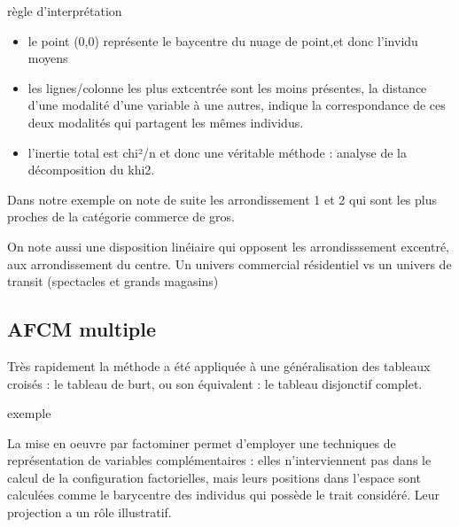 \documentclass[
]{book}
\newenvironment{Shaded}{\begin{snugshade}}{\end{snugshade}}
\newcommand{\KeywordTok}[1]{\textcolor[rgb]{0.13,0.29,0.53}{\textbf{#1}}}
\newcommand{\NormalTok}[1]{#1}
\newcommand{\OperatorTok}[1]{\textcolor[rgb]{0.81,0.36,0.00}{\textbf{#1}}}
\providecommand{\tightlist}{%
  \setlength{\itemsep}{0pt}\setlength{\parskip}{0pt}}
\begin{document}
règle d'interprétation

\begin{itemize}
\tightlist
\item
  le point (0,0) représente le baycentre du nuage de point,et donc l'invidu moyens
\item
  les lignes/colonne les plus extcentrée sont les moins présentes, la distance d'une modalité d'une variable à une autres, indique la correspondance de ces deux modalités qui partagent les mêmes individus.
\item
  l'inertie total est chi²/n et donc une véritable méthode : analyse de la décomposition du khi2.
\end{itemize}

Dans notre exemple on note de suite les arrondissement 1 et 2 qui sont les plus proches de la catégorie commerce de gros.

On note aussi une disposition linéiaire qui opposent les arrondisssement excentré, aux arrondissement du centre. Un univers commercial résidentiel vs un univers de transit (spectacles et grands magasins)

\hypertarget{afcm-multiple}{%
\subsection{AFCM multiple}\label{afcm-multiple}}

Très rapidement la méthode a été appliquée à une généralisation des tableaux croisés : le tableau de burt, ou son équivalent : le tableau disjonctif complet.

exemple

La mise en oeuvre par factominer permet d'employer une techniques de représentation de variables complémentaires : elles n'interviennent pas dans le calcul de la configuration factorielles, mais leurs positions dans l'espace sont calculées comme le barycentre des individus qui possède le trait considéré. Leur projection a un rôle illustratif.

\begin{Shaded}
\end{Shaded}
\end{document}
